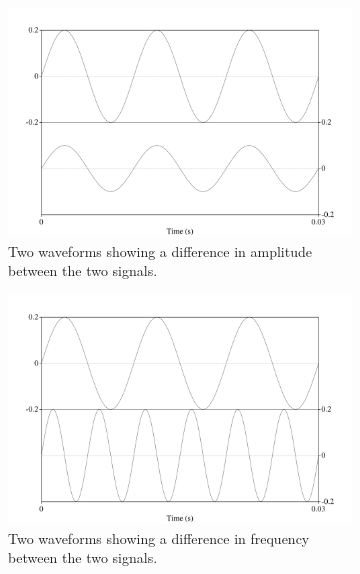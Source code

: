 \begin{figure}[h!]
\begin{subfigure}{0.5\textwidth}
  \includegraphics[width=\textwidth]{figure/basic-sound-amplitude.png}
  \caption{Two waveforms showing a difference in amplitude between the two signals.}
  \label{fig:basic-sound-amplitude}
\end{subfigure}
\qquad
\begin{subfigure}{0.5\textwidth}
  \includegraphics[width=\textwidth]{figure/basic-sound-frequency.png}
  \caption{Two waveforms showing a difference in frequency between the two signals.}
  \label{fig:basic-sound-frequency}
\end{subfigure}
%
\\[2ex]
\begin{center}
\begin{subfigure}{0.5\textwidth}

\end{subfigure}
\end{center}
\end{figure}
